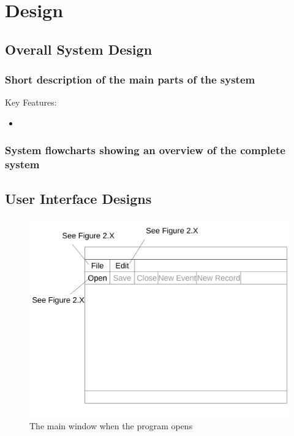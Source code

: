 \chapter{Design}

\section{Overall System Design}

\subsection{Short description of the main parts of the system}

Key Features:
\begin{itemize}
	\item 
\end{itemize}

\subsection{System flowcharts showing an overview of the complete system}

\section{User Interface Designs}
\begin{figure}[H]
    	\includegraphics[width=\textwidth]{./UI Design/BasePart1.pdf}
    	\caption{The main window when the program opens} \label{fig:The main window when the program opens}
\end{figure}

